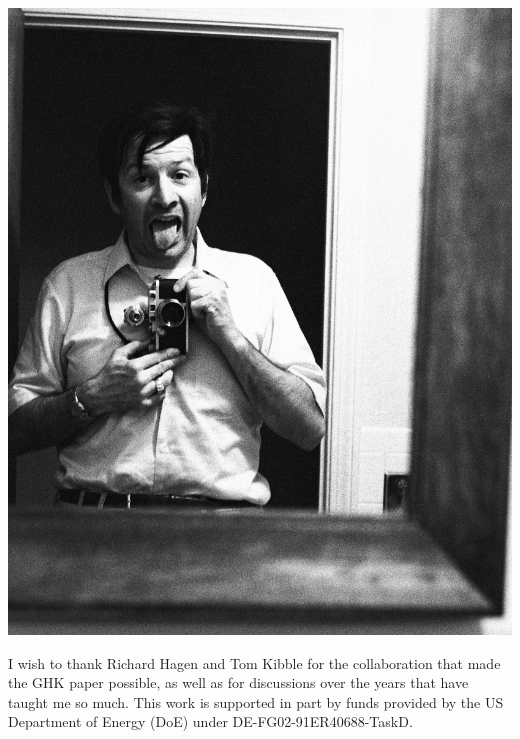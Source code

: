 \documentclass[letterpaper,twoside,preprintnumbers,slac_one]{revtex4}
\begin{document}
\begin{flushright}
  \includegraphics[scale=0.16]{ggt2.jpg}
\end{flushright}
%
%
%
%
\begin{acknowledgments}
I wish to thank Richard Hagen and Tom Kibble for the collaboration that made
the GHK paper possible, as well as for discussions over the years that have
taught me so much. This work is supported in part by funds provided by the US Department
of Energy (\textsf{DoE}) under \textsf{DE-FG02-91ER40688-TaskD}.
\end{acknowledgments}
\end{document}
